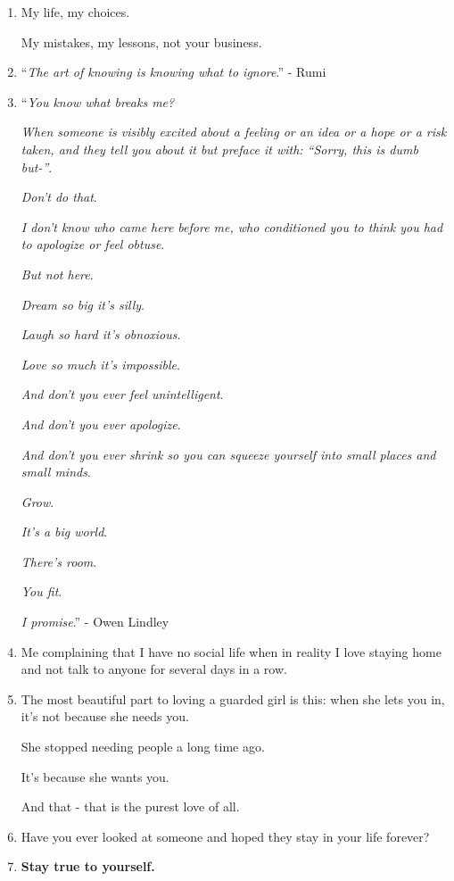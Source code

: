 \documentclass{article}
\numberwithin{equation}{section}
\begin{document}
\begin{enumerate}
    I no longer have time to explain myself.
    
    You can also add some if you want.
    \item My life, my choices.
    
    My mistakes, my lessons, not your business.
    \item ``\textit{The art of knowing is knowing what to ignore}.'' - Rumi
    \item ``\textit{You know what breaks me?}
    
    \textit{When someone is visibly excited about a feeling or an idea or a hope or a risk taken, and they tell you about it but preface it with: ``Sorry, this is dumb but-''}.
    
    \textit{Don't do that}.
    
    \textit{I don't know who came here before me, who conditioned you to think you had to apologize or feel obtuse}.
    
    \textit{But not here}.
    
    \textit{Dream so big it's silly}.
    
    \textit{Laugh so hard it's obnoxious}.
    
    \textit{Love so much it's impossible}.
    
    \textit{And don't you ever feel unintelligent}.
    
    \textit{And don't you ever apologize}.
    
    \textit{And don't you ever shrink so you can squeeze yourself into small places and small minds}.
    
    \textit{Grow}.
    
    \textit{It's a big world}.
    
    \textit{There's room}.
    
    \textit{You fit}.
    
    \textit{I promise}.'' - Owen Lindley
    \item Me complaining that I have no social life when in reality I love staying home and not talk to anyone for several days in a row.
    \item The most beautiful part to loving a guarded girl is this: when she lets you in, it's not because she needs you.
    
    She stopped needing people a long time ago.
    
    It's because she wants you.
    
    And that - that is the purest love of all.
    \item Have you ever looked at someone and hoped they stay in your life forever?
    \item \textbf{Stay true to yourself.}
    

\end{enumerate}
\end{document}
